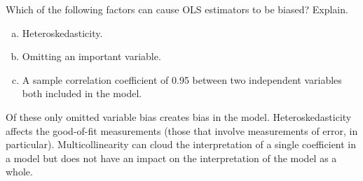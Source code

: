 \item Which of the following factors can cause OLS estimators to be biased? Explain. %
	\begin{enumerate}[a.]
		\item Heteroskedasticity.
		\item Omitting an important variable.
		\item A sample correlation coefficient of 0.95 between two independent variables both included in the model.
	\end{enumerate}
	
	Of these only omitted variable bias creates bias in the model.  Heteroskedasticity affects the good-of-fit measurements (those that involve measurements of error, in particular).  Multicollinearity can cloud the interpretation of a single coefficient in a model but does not  have an impact on the interpretation of the model as a whole.  \\
